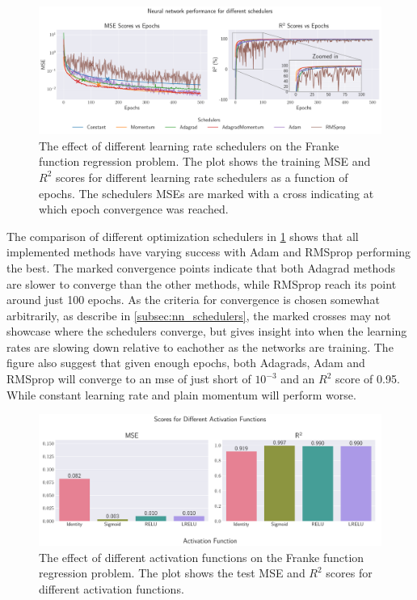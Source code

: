 \onecolumngrid
\begin{figure}[ht!]
    \centering
    \includegraphics[width = .9\textwidth]{../figs/b_schedulers.pdf}
    \caption{The effect of different learning rate schedulers on the Franke function regression problem. The plot shows the training MSE and \( R^2 \) scores for different learning rate schedulers as a function of epochs. The schedulers MSEs are marked with a cross indicating at which epoch convergence was reached.}
    \label{fig:NN_Franke_schedulers}
\end{figure}
\twocolumngrid

The comparison of different optimization schedulers in \cref{fig:NN_Franke_schedulers} shows that all implemented methods have varying success with Adam and RMSprop performing the best. The marked convergence points indicate that both Adagrad methods are slower to converge than the other methods, while RMSprop reach its point around just 100 epochs. As the criteria for convergence is chosen somewhat arbitrarily, as describe in \cref{subsec:nn_schedulers}, the marked crosses may not showcase where the schedulers converge, but gives insight into when the learning rates are slowing down relative to eachother as the networks are training. The figure also suggest that given enough epochs, both Adagrads, Adam and RMSprop will converge to an mse of just short of \( 10^{-3} \) and an \( R^2 \) score of 0.95. While constant learning rate and plain momentum will perform worse.

\onecolumngrid
\begin{figure}[ht!]
    \centering
    \includegraphics[width = .9\textwidth]{../figs/c_activation_funcs.pdf}
    \caption{The effect of different activation functions on the Franke function regression problem. The plot shows the test MSE and \( R^2 \) scores for different activation functions.}
    \label{fig:NN_Franke_activation}
\end{figure}
\twocolumngrid

